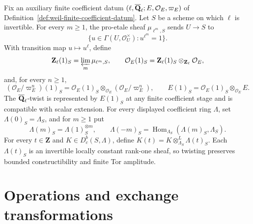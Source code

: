 \begin{definition}
\label{def:coefficient-twists}


Fix an auxiliary finite coefficient datum
\((\ell,\overline{\mathbf Q}_\ell;E,\mathcal O_E,\varpi_E)\) of
Definition~\ref{def:weil-finite-coefficient-datum}.
Let \(S\) be a scheme on which \(\ell\) is invertible.  For every
\(m\geq1\), the pro-etale sheaf \(\mu_{\ell^m,S}\) sends \(U\to S\) to
\[
 \{u\in\Gamma(U,\mathcal O_U^\times):u^{\ell^m}=1\}.
\]
With transition map \(u\mapsto u^\ell\), define
\[
 \mathbf Z_\ell(1)_S=\varprojlim_m\mu_{\ell^m,S},\qquad
 \mathcal O_E(1)_S=\mathbf Z_\ell(1)_S\otimes_{\mathbf Z_\ell}\mathcal O_E,
\]
and, for every \(n\geq1\),
\[
 (\mathcal O_E/\varpi_E^n)(1)_S
 =\mathcal O_E(1)_S\otimes_{\mathcal O_E}
   (\mathcal O_E/\varpi_E^n),
 \qquad E(1)_S=\mathcal O_E(1)_S\otimes_{\mathcal O_E}E.
\]
The \(\overline{\mathbf Q}_\ell\)-twist is represented by \(E(1)_S\) at any finite coefficient
stage and is compatible with scalar extension.  For every displayed
coefficient ring \(\Lambda\), set \(\Lambda(0)_S=\Lambda_S\), and for
\(m\geq1\) put
\[
 \Lambda(m)_S=\Lambda(1)_S^{\otimes m},\qquad
 \Lambda(-m)_S=
 \operatorname{Hom}_{\Lambda_S}(\Lambda(m)_S,\Lambda_S).
\]
For every \(t\in\mathbf Z\) and \(K\in D^b_c(S,\Lambda)\), define
\(K(t)=K\otimes^L_{\Lambda_S}\Lambda(t)_S\).  Each \(\Lambda(t)_S\) is an
invertible locally constant rank-one sheaf, so twisting preserves
bounded constructibility and finite Tor amplitude.
\end{definition}


\section{Operations and exchange transformations}

